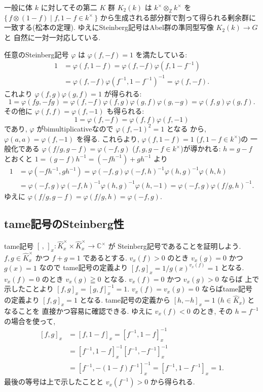 \documentclass[12pt,twoside]{jarticle}
\newcommand\Z{{\mathbb Z}} %
\newcommand\C{{\mathbb C}} %
\theoremstyle{definition} %
\theoremstyle{definition} %
\theoremstyle{definition} %
\numberwithin{theorem}{section}
\numberwithin{equation}{section}
\numberwithin{figure}{section}
\numberwithin{table}{section}
\newcommand\Khat{{\widehat K}}
\newcommand\tame[3]{\left[#2,#3\right]_{#1}}
\begin{document}
一般に体 $k$ に対してその第二 $K$ 群 $K_2(k)$ は
$k^\times\otimes_\Z k^\times$ を $\{\,f\otimes(1-f)\mid f,1-f\in k^\times\,\}$
から生成される部分群で割って得られる剰余群に一致する(松本の定理).
ゆえにSteinberg記号はAbel群の準同型写像 $K_2(k)\to G$ と
自然に一対一対応している.

任意のSteinberg記号 $\varphi$ は $\varphi(f,-f)=1$ を満たしている:
\begin{align*}
1
&
=\varphi(f,1-f)
=\varphi(f,-f)\varphi(f,1-f^{-1})
\\ &
=\varphi(f,-f)\varphi(f^{-1},1-f^{-1})^{-1}
=\varphi(f,-f).
\end{align*}
これより $\varphi(f,g)\varphi(g,f)=1$ が得られる:
\[
1
=\varphi(fg,-fg)
=\varphi(f,-f)\varphi(f,g)\varphi(g,f)\varphi(g,-g)
=\varphi(f,g)\varphi(g,f).
\]
その他に $\varphi(f,f)=\varphi(f,-1)$ も得られる:
\[
1=\varphi(f,-f)=\varphi(f,f)\varphi(f,-1)
\]
であり, $\varphi$ がbimultiplicativeなので $\varphi(f,-1)^2=1$ となる
から, $\varphi(a,a)=\varphi(f,-1)$ を得る.
これらより, $\varphi(f,1-f)=1$ ($f,1-f\in k^\times$)の
一般化である $\varphi(f/g,g-f)=\varphi(-f,g)$ ($f,g,g-f\in k^\times$)が導かれる:
$h=g-f$ とおくと $1=(g-f)h^{-1}=(-fh^{-1})+gh^{-1}$ より
\begin{align*}
1 
&
= \varphi(-fh^{-1}, gh^{-1}) 
= \varphi(-f,g)\varphi(-f,h)^{-1}\varphi(h,g)^{-1}\varphi(h,h)
\\ &
= \varphi(-f,g)\varphi(-f,h)^{-1}\varphi(h,g)^{-1}\varphi(h,-1)
= \varphi(-f,g)\varphi(f/g,h)^{-1}.
\end{align*}
ゆえに $\varphi(f/g,g-f)=\varphi(f/g,h)=\varphi(-f,g)$.


\subsection{tame記号のSteinberg性}

tame記号 $\tame{x}{\,}{\,}:\Khat_x^\times\times\Khat_x^\times\to\C^\times$ が
Steinberg記号であることを証明しよう.
$f,g\in\Khat_x^\times$ かつ $f+g=1$ であるとする.
$v_x(f)>0$ のとき $v_x(g)=0$ かつ $g(x)=1$ なので
tame記号の定義より $\tame{x}{f}{g}=1/g(x)^{v_x(f)}=1$ となる.
$v_x(f)=0$ のとき $v_x(g)\geqq 0$ となる.
$v_x(f)=0$ かつ $v_x(g)>0$ ならば
上で示したことより $\tame{x}{f}{g}=\tame{x}{g}{f}^{-1}=1$.
$v_x(f)=v_x(g)=0$ ならばtame記号の定義より $\tame{x}{f}{g}=1$ となる.
tame記号の定義から $\tame{x}{h}{-h}=1$ ($h\in\Khat_x$) となることを
直接かつ容易に確認できる. ゆえに $v_x(f)<0$ のとき, その $h=f^{-1}$ の場合を使って,
\begin{align*}
\tame{x}{f}{g}
&
= \tame{x}{f}{1-f}
= \tame{x}{f^{-1}}{1-f}^{-1}
\\ &
= \tame{x}{f^{-1}}{1-f}^{-1} \tame{x}{f^{-1}}{-f^{-1}}^{-1}
\\ &
= \tame{x}{f^{-1}}{-(1-f)f^{-1}}^{-1}
= \tame{x}{f^{-1}}{1-f^{-1}}
= 1.
\end{align*}
最後の等号は上で示したことと $v_x(f^{-1})>0$ から得られる.
\end{document}
